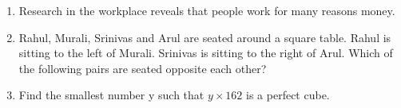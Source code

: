 \documentclass[a4paper, 11pt]{article}
\begin{document}
\begin{enumerate}
    \hfill{}
    
    \item Research in the workplace reveals that people work for many reasons \underline{\hspace{2cm}} money.
    \begin{enumerate}
    \end{enumerate}
    
    \hfill{}
    
    \item Rahul, Murali, Srinivas and Arul are seated around a square table. Rahul is sitting to the left of Murali. Srinivas is sitting to the right of Arul. Which of the following pairs are seated opposite each other?
    \begin{enumerate}
    \end{enumerate}
    
    \hfill{}

    \item Find the smallest number y such that $y \times 162$ is a perfect cube.
    \begin{enumerate}
    \end{enumerate}
    
    \hfill{}
    

\end{enumerate}
\end{document}
